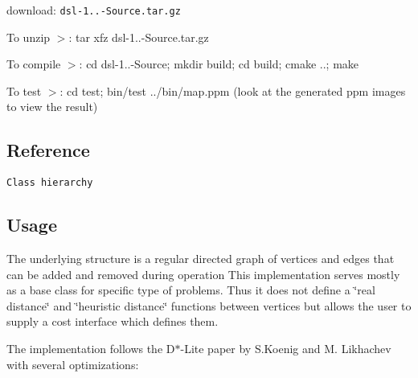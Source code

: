 \begin{DoxyItemize}
\item download\-: {\tt dsl-\/1..-\/\-Source.\-tar.\-gz}
\item To unzip $>$\-: tar xfz dsl-\/1..-\/\-Source.\-tar.\-gz
\item To compile $>$\-: cd dsl-\/1..-\/\-Source; mkdir build; cd build; cmake ..; make
\item To test $>$\-: cd test; bin/test ../bin/map.ppm (look at the generated ppm images to view the result)
\end{DoxyItemize}\subsection{Reference}\label{index_Class}
{\tt Class hierarchy}\subsection{Usage}\label{index_Usage}
The underlying structure is a regular directed graph of vertices and edges that can be added and removed during operation This implementation serves mostly as a base class for specific type of problems. Thus it does not define a \char`\"{}real distance\char`\"{} and \char`\"{}heuristic distance\char`\"{} functions between vertices but allows the user to supply a cost interface which defines them.

The implementation follows the D$\ast$-\/\-Lite paper by S.\-Koenig and M. Likhachev with several optimizations\-:



